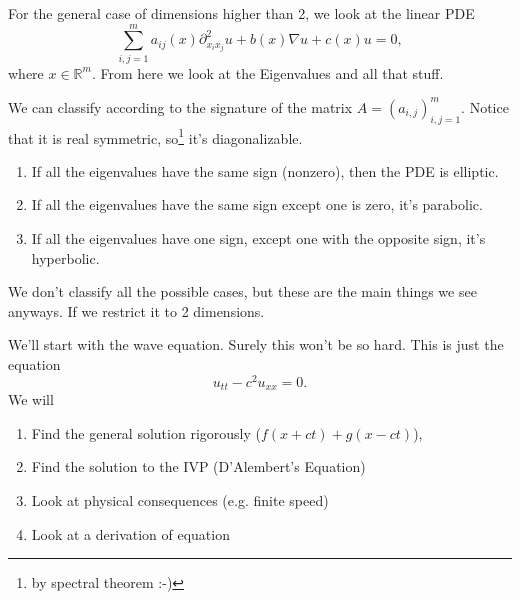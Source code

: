For the general case of dimensions higher than 2, we look at the linear PDE
\[ \sum_{i,j=1}^{m} a_{ij}(x) \partial_{x_{i}x_{j}}^{2} u + b(x) \nabla u + c(x) u = 0,  \]
where \( x \in \mathbb{R}^{m} \). From here we look at the Eigenvalues and all that stuff.
\begin{theorem}
	We can classify according to the signature of the matrix \( A = (a_{i,j})^{m}_{i,j=1} \). Notice that it is real symmetric, so\footnote{by spectral theorem :-)} it's diagonalizable.
	\begin{enumerate}
	
		\item If all the eigenvalues have the same sign (nonzero), then the PDE is elliptic.
		\item If all the eigenvalues have the same sign except one is zero, it's parabolic.
		\item If all the eigenvalues have one sign, except one with the opposite sign, it's hyperbolic.
	
	\end{enumerate}
	We don't classify all the possible cases, but these are the main things we see anyways. If we restrict it to 2 dimensions.
\end{theorem}

We'll start with the wave equation. Surely this won't be so hard.
This is just the equation
	\[ u_{t t} - c^{2} u_{x x} = 0. \]
	We will
\begin{enumerate}

	\item Find the general solution rigorously (\( f(x + ct) + g(x - ct) \)),
	\item Find the solution to the IVP (D'Alembert's Equation)
	\item Look at physical consequences (e.g. finite speed)
	\item Look at a derivation of equation

\end{enumerate}

